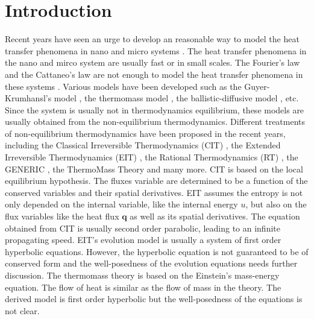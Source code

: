 \documentclass[a4paper]{article}
\begin{document}
\section{Introduction}
Recent years have seen an urge to develop an reasonable way to model the heat transfer phenomena in nano and micro systems \cite{chen2005nanoscale,tzou1996macro,wang2007heat,ding2006heat}. The heat transfer phenomena in the nano and mirco system are usually fast or in small scales. The Fourier's law and the Cattaneo's law are not enough to model the heat transfer phenomena in these systems \cite{chen2005nanoscale,Jou1996extended}. Various models have been developed such as the Guyer-Krumhansl's model \cite{guyer1966solution}, the thermomass model \cite{tzou2010nonlocal}, the ballistic-diffusive model \cite{chen2001ballistic,chen2002ballistic}, etc. Since the system is usually not in thermodynamics equilibrium, these models are usually obtained from the non-equilibrium thermodynamics. Different treatments of non-equilibrium thermodynamics have been proposed in the recent years, including the Classical Irreversible Thermodynamics (CIT) \cite{lebon2008classical}, the Extended Irreversible Thermodynamics (EIT) \cite{Jou1996extended}, the Rational Thermodynamics (RT) \cite{muller1998rational}, the GENERIC \cite{hans2005beyond}, the ThermoMass Theory \cite{zeng2006motion,dong2011generalized} and many more. CIT is based on the local equilibrium hypothesis. The fluxes variable are determined to be a function of the conserved variables and their spatial derivatives. EIT assumes the entropy is not only depended on the internal variable, like the internal energy $u$, but also on the flux variables like the heat flux $\mathbf{q}$ as well as its spatial derivatives. The equation obtained from CIT is usually second order parabolic, leading to an infinite propagating speed. EIT's evolution model is usually a system of first order hyperbolic equations. However, the hyperbolic equation is not guaranteed to be of conserved form and the well-posedness of the evolution equations needs further discussion.\cite{Jou1996extended} The thermomass theory is based on the Einstein's mass-energy equation. The flow of heat is similar as the flow of mass in the theory. The derived model is first order hyperbolic but the well-posedness of the equations is not clear.%
\end{document}
